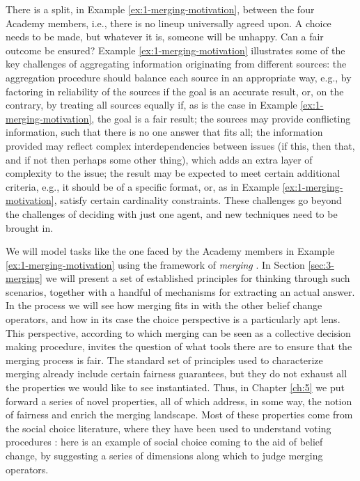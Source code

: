 There is a split, in Example \ref{ex:1-merging-motivation},
between the four Academy members,
i.e., there is no lineup universally agreed upon.
A choice needs to be made, but whatever it is, 
someone will be unhappy.
Can a fair outcome be ensured?
Example \ref{ex:1-merging-motivation} 
illustrates some of the key challenges of 
aggregating information originating from different sources:
the aggregation procedure should balance each source in an appropriate way, 
e.g., by factoring in reliability of the sources if the goal is an accurate result, 
or, on the contrary, by treating all sources equally if, 
as is the case in Example \ref{ex:1-merging-motivation},
the goal is a fair result;
the sources may provide conflicting information, 
such that there is no one answer that fits all; 
the information provided may reflect complex interdependencies between issues
(if this, then that, and if not then perhaps some other thing), 
which adds an extra layer of complexity to the issue;
the result may be expected to meet certain additional criteria, 
e.g., it should be of a specific format, or, 
as in Example \ref{ex:1-merging-motivation},
satisfy certain cardinality constraints.
These challenges go beyond the challenges of 
deciding with just one agent,
and new techniques need to be brought in.

We will model tasks like the one faced by 
the Academy members in Example \ref{ex:1-merging-motivation}
using the framework of \emph{merging} \cite{KoniecznyP02,KoniecznyP11}. 
In Section \ref{sec:3-merging} we will present
a set of established principles for thinking through such scenarios,
together with a handful of mechanisms for extracting an actual answer.
In the process we will see how 
merging fits in with the other belief change operators,
and how in its case the choice perspective is 
a particularly apt lens.
This perspective, according to which merging 
can be seen as a collective decision making procedure,
invites the question of what tools there 
are to ensure that the merging process is fair.
The standard set of principles used to characterize 
merging already include certain fairness guarantees,
but they do not exhaust all the properties 
we would like to see instantiated.
Thus, in Chapter \ref{ch:5} we put forward 
a series of novel properties,
all of which address, in some way, the notion of 
fairness and enrich the merging landscape.
Most of these properties come from the social choice literature,
where they have been used to understand voting procedures \cite{Zwicker16,BaumeisterR16}:
here is an example of social choice coming to the aid 
of belief change, by suggesting a series of dimensions along which
to judge merging operators.

